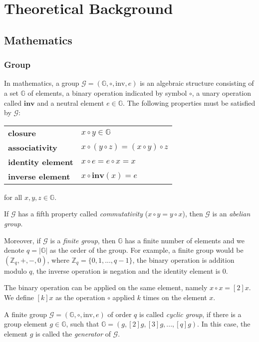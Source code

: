 \section{Theoretical Background}

\subsection{Mathematics}

\subsubsection{Group}
In mathematics, a group \( \mathcal{G} = (\mathbb{G}, \circ, \mathrm{inv}, e) \) is an algebraic structure consisting of a set $\mathbb{G}$ of elements, a binary operation indicated by symbol \( \circ \), a unary operation called $\mathbf{inv}$ and a neutral element \( e \in \mathbb{G} \). The following properties must be satisfied by $\mathcal{G}$:

\begin{center}
\begin{tabular}{ l l }
 \textbf{closure} & \( x \circ y \in \mathbb{G} \) \\ 
 \textbf{associativity} & \( x \circ (y \circ z) = (x \circ y) \circ z \) \\  
 \textbf{identity element} & \( x \circ e = e \circ x = x \)  \\
 \textbf{inverse element} & \( x \circ \mathbf{inv}(x) = e \)
\end{tabular}
\end{center}
for all \( x, y, z \in \mathbb{G} \).

If $\mathcal{G}$ has a fifth property called \textit{commutativity} (\( x \circ y = y \circ x \)), then $\mathcal{G}$ is an \textit{abelian group}. 

Moreover, if $\mathcal{G}$ is a \textit{finite group}, then $\mathbb{G}$ has a finite number of elements and we denote \( q = |\mathbb{G}| \) as the order of the group. For example, a finite group would be \( (\mathbb{Z}_q, +, -, 0) \), where \( \mathbb{Z}_q  = \{0, 1, ..., q-1\} \), the binary operation is addition modulo $q$, the inverse operation is negation and the identity element is 0.

The binary operation can be applied on the same element, namely \( x \circ x = [2]x \). We define $[k]x$ as the operation $\circ$ applied $k$ times on the element $x$. 

A finite group \( \mathcal{G} = (\mathbb{G}, \circ, \mathrm{inv}, e) \) of order $q$ is called \textit{cyclic group}, if there is a group element \( g \in \mathbb{G} \), such that \( \mathbb{G} = (g, [2]g, [3]g, ..., [q]g) \). In this case, the element $g$ is called the \textit{generator} of $\mathcal{G}$.

